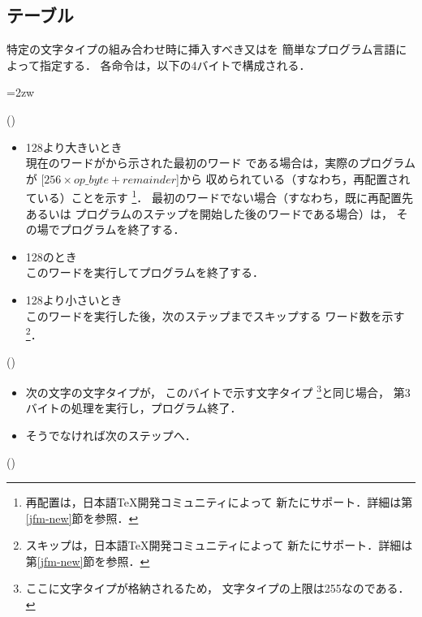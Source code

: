 \documentclass[a4paper,11pt,nomag]{jsarticle}
\def\size#1{\mathit{#1}}
\begin{document}

\subsection{テーブル}
特定の文字タイプの組み合わせ時に挿入すべき又はを
簡単なプログラム言語によって指定する．
各命令は，以下の4バイトで構成される．
\begin{description}\itemindent=2zw
\item[第1バイト] ()
  \begin{itemize}
  \item 128より大きいとき\\
    現在のワードがから示された最初のワード
    である場合は，実際のプログラムが
    [$256\times\size{op\_byte}+\size{remainder}$]から
    収められている（すなわち，再配置されている）ことを示す
    \footnote{再配置は，日本語\TeX{}開発コミュニティによって
    新たにサポート．詳細は第\ref{jfm-new}節を参照．}．
    最初のワードでない場合（すなわち，既に再配置先あるいは
    プログラムのステップを開始した後のワードである場合）は，
    その場でプログラムを終了する．
  \item 128のとき\\
    このワードを実行してプログラムを終了する．
  \item 128より小さいとき\\
    このワードを実行した後，次のステップまでスキップする
    ワード数を示す
    \footnote{スキップは，日本語\TeX{}開発コミュニティによって
    新たにサポート．詳細は第\ref{jfm-new}節を参照．}．
  \end{itemize}
\item[第2バイト] ()
  \begin{itemize}
  \item 次の文字の文字タイプが，
    このバイトで示す文字タイプ
    \footnote{ここに文字タイプが格納されるため，
    文字タイプの上限は255なのである．}と同じ場合，
    第3バイトの処理を実行し，プログラム終了．
  \item そうでなければ次のステップへ．
  \end{itemize}
\item[第3バイト] ()\\

\end{description}
\end{document}
